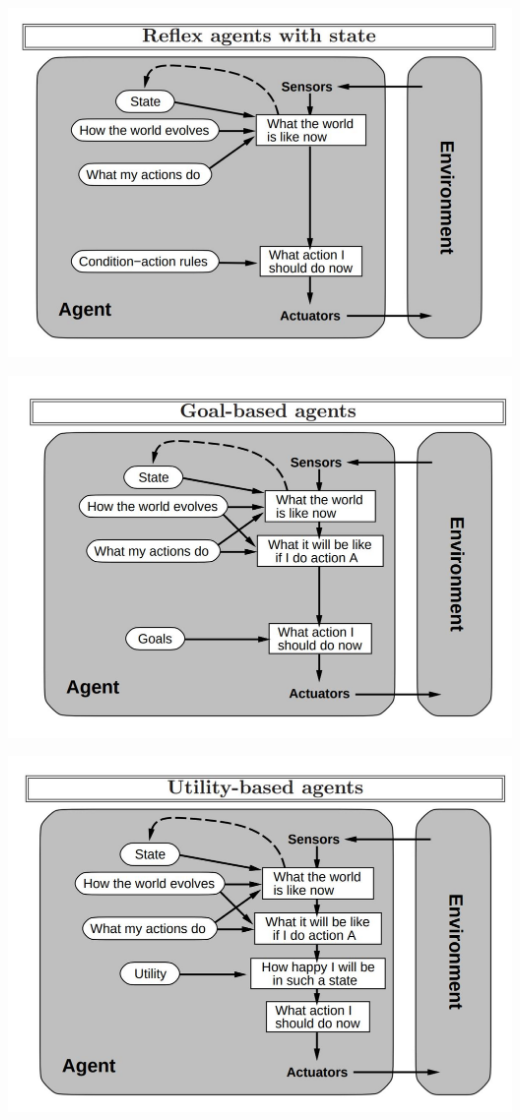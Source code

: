 \documentclass{beamer}
\begin{document}
	\begin{frame}
		\centering
		\includegraphics[scale=0.21]{a2.jpeg}
	\end{frame}

	\begin{frame}
		\centering
		\includegraphics[scale=0.21]{a3.jpeg}
	\end{frame}

	\begin{frame}
		\centering
		\includegraphics[scale=0.21]{a4.jpeg}
	\end{frame}
\end{document}
